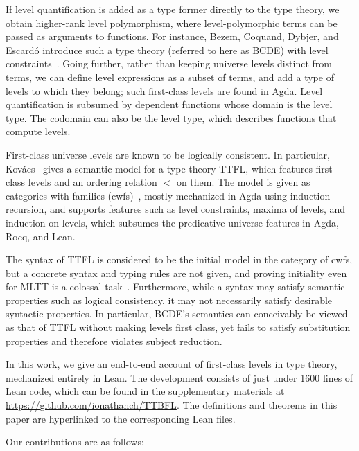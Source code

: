 \documentclass[a4paper,UKenglish,cleveref,autoref,thm-restate]{lipics-v2021}
\newcommand{\citep}[1]{\cite{#1}}
\newcommand{\repo}{\url{https://github.com/ionathanch/TTBFL}}
\begin{document}
If level quantification is added as a type former directly to the type theory,
we obtain higher-rank level polymorphism,
where level-polymorphic terms can be passed as arguments to functions.
For instance, Bezem, Coquand, Dybjer, and Escard\'o
introduce such a type theory (referred to here as BCDE)
with level constraints~\citep{univ-poly}.
Going further, rather than keeping universe levels distinct from terms,
we can define level expressions as a subset of terms,
and add a type of levels to which they belong;
such first-class levels are found in Agda.
Level quantification is subsumed by dependent functions whose domain is the level type.
The codomain can also be the level type,
which describes functions that compute levels.

First-class universe levels are known to be logically consistent.
In particular, Kov\'{a}cs~\citep{gen-univ} gives a semantic model for a type theory TTFL,
which features first-class levels and an ordering relation $<$ on them.
The model is given as categories with families (cwfs)~\citep{cwf},
mostly mechanized in Agda using induction--recursion,
and supports features such as level constraints,
maxima of levels, and induction on levels,
which subsumes the predicative universe features in Agda, Rocq, and Lean.

The syntax of TTFL is considered to be the initial model in the category of cwfs,
but a concrete syntax and typing rules are not given,
and proving initiality even for MLTT is a colossal task~\citep{initiality}.
Furthermore, while a syntax may satisfy semantic properties such as logical consistency,
it may not necessarily satisfy desirable syntactic properties.
In particular, BCDE's semantics can conceivably be viewed as
that of TTFL without making levels first class,
yet fails to satisfy substitution properties and therefore violates subject reduction.

In this work, we give an end-to-end account of first-class levels in type theory,
mechanized entirely in Lean.
The development consists of just under 1600 lines of Lean code,
which can be found in the supplementary materials at \repo{}.
The definitions and theorems in this paper
are hyperlinked to the corresponding Lean files.

Our contributions are as follows:
\end{document}
